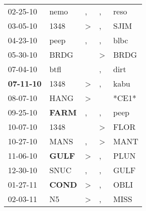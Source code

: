 \begin{supertabular}{p{0.07\textwidth}p{0.06\textwidth}p{0.02\textwidth}p{0.02\textwidth}p{0.06\textwidth}}
          02-25-10\textsuperscript{} &           nemo\textsuperscript{} &                , &                , &           reso\textsuperscript{} \\
          03-05-10\textsuperscript{} &           1348\textsuperscript{} &     \textgreater &                , &           SJIM\textsuperscript{} \\
          04-23-10\textsuperscript{} &           peep\textsuperscript{} &                , &                , &           blbc\textsuperscript{} \\
          05-30-10\textsuperscript{} &           BRDG\textsuperscript{} &                  &     \textgreater &           BRDG\textsuperscript{} \\
          07-04-10\textsuperscript{} &           btfl\textsuperscript{} &                  &                , &           dirt\textsuperscript{} \\
 \textbf{07-11-10\textsuperscript{}} &           1348\textsuperscript{} &     \textgreater &                , &           kabu\textsuperscript{} \\
          08-07-10\textsuperscript{} &           HANG\textsuperscript{} &     \textgreater &                  &                            *CE1* \\
          09-25-10\textsuperscript{} &  \textbf{FARM\textsuperscript{}} &                , &                , &           peep\textsuperscript{} \\
          10-07-10\textsuperscript{} &           1348\textsuperscript{} &                  &     \textgreater &           FLOR\textsuperscript{} \\
          10-27-10\textsuperscript{} &           MANS\textsuperscript{} &                , &     \textgreater &           MANT\textsuperscript{} \\
          11-06-10\textsuperscript{} &  \textbf{GULF\textsuperscript{}} &     \textgreater &                , &           PLUN\textsuperscript{} \\
          12-30-10\textsuperscript{} &           SNUC\textsuperscript{} &                , &                , &           GULF\textsuperscript{} \\
          01-27-11\textsuperscript{} &  \textbf{COND\textsuperscript{}} &     \textgreater &                , &           OBLI\textsuperscript{} \\
          02-03-11\textsuperscript{} &             N5\textsuperscript{} &     \textgreater &                , &           MISS\textsuperscript{} \\

\end{supertabular}
